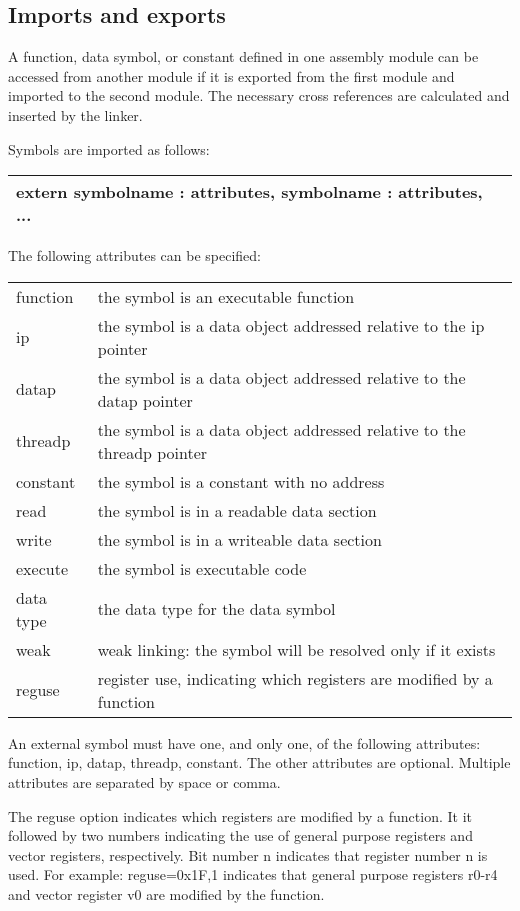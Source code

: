 \documentclass[forwardcom.tex]{subfiles}
\begin{document}
\subsection{Imports and exports} \label{assemblyImportExport}
A function, data symbol, or constant defined in one assembly module can be accessed from another module if it is exported from the first module and imported to the second module. The necessary cross references are calculated and inserted by the linker.
\vv

Symbols are imported as follows:
\vv

\begin{tabular}{|p{150mm}|}
\hline
\hspace{4mm} extern symbolname : attributes, symbolname : attributes, ...\\
\hline
\end{tabular}
\vv

The following attributes can be specified:
\vv

\begin{tabular}{|p{20mm}p{130mm}|}
\hline
function & the symbol is an executable function\\
ip & the symbol is a data object addressed relative to the ip pointer\\
datap & the symbol is a data object addressed relative to the datap pointer\\
threadp & the symbol is a data object addressed relative to the threadp pointer\\
constant & the symbol is a constant with no address\\
read & the symbol is in a readable data section\\
write & the symbol is in a writeable data section\\
execute & the symbol is executable code\\
data type & the data type for the data symbol\\
weak & weak linking: the symbol will be resolved only if it exists\\
reguse & register use, indicating which registers are modified by a function\\
\hline
\end{tabular}
\vv

An external symbol must have one, and only one, of the following attributes: function, ip, datap, threadp, constant.
The other attributes are optional. Multiple attributes are separated by space or comma.
\vv

The reguse option indicates which registers are modified by a function. 
It it followed by two numbers indicating the use of general purpose registers and vector registers, respectively. Bit number n indicates that register number n is used. For example: reguse=0x1F,1 indicates that general purpose registers r0-r4 and vector register v0 are modified by the function.
\vv
\end{document}
